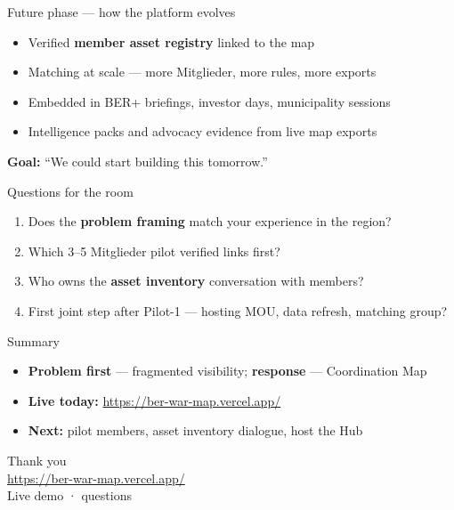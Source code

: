 \documentclass[aspectratio=169,11pt]{beamer}
\newcommand{\demourl}{\url{https://ber-war-map.vercel.app/}}
\begin{document}
\begin{frame}{Future phase --- how the platform evolves}
  \begin{itemize}
    \item Verified \textbf{member asset registry} linked to the map
    \item Matching at scale --- more Mitglieder, more rules, more exports
    \item Embedded in BER+ briefings, investor days, municipality sessions
    \item Intelligence packs and advocacy evidence from live map exports
  \end{itemize}
  \vspace{0.4em}
  \textbf{Goal:} ``We could start building this tomorrow.''
\end{frame}

\begin{frame}{Questions for the room}
  \begin{enumerate}
    \item Does the \textbf{problem framing} match your experience in the region?
    \item Which 3--5 Mitglieder pilot verified links first?
    \item Who owns the \textbf{asset inventory} conversation with members?
    \item First joint step after Pilot-1 --- hosting MOU, data refresh, matching group?
  \end{enumerate}
\end{frame}

\begin{frame}{Summary}
  \begin{itemize}
    \item \textbf{Problem first} --- fragmented visibility; \textbf{response} --- Coordination Map
    \item \textbf{Live today:} \demourl
    \item \textbf{Next:} pilot members, asset inventory dialogue, host the Hub
  \end{itemize}
\end{frame}

\begin{frame}[plain]
  \centering
  \Large Thank you\\[1.2em]
  \normalsize\demourl\\[0.6em]
  \small Live demo · questions
\end{frame}
\end{document}
